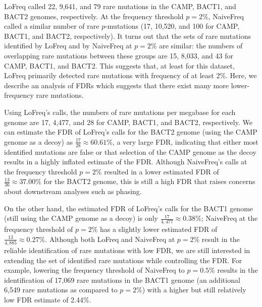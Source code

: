 LoFreq called 22, 9,641, and 79 rare mutations in the CAMP, BACT1, and BACT2 genomes, respectively. At the frequency threshold $p = 2\%$, NaiveFreq called a similar number of rare $p$-mutations (17, 10,520, and 100 for CAMP, BACT1, and BACT2, respectively). It turns out that the sets of rare mutations identified by LoFreq and by NaiveFreq at $p = 2\%$ are similar: the numbers of overlapping rare mutations between these groups are 15, 8,033, and 43 for CAMP, BACT1, and BACT2. This suggests that, at least for this dataset, LoFreq primarily detected rare mutations with frequency of at least 2\%. Here, we describe an analysis of FDRs which suggests that there exist many more lower-frequency rare mutations.

Using LoFreq's calls, the numbers of rare mutations per megabase for each genome are 17, 4,477, and 28 for CAMP, BACT1, and BACT2, respectively. We can estimate the FDR of LoFreq's calls for the BACT2 genome (using the CAMP genome as a decoy) as $\frac{17}{28} \approx 60.61\%$, a very large FDR, indicating that either most identified mutations are false or that selection of the CAMP genome as the decoy results in a highly inflated estimate of the FDR. Although NaiveFreq's calls at the frequency threshold $p = 2\%$ resulted in a lower estimated FDR of $\frac{13}{36} \approx 37.00\%$ for the BACT2 genome, this is still a high FDR that raises concerns about downstream analyses such as phasing.

On the other hand, the estimated FDR of LoFreq's calls for the BACT1 genome (still using the CAMP genome as a decoy) is only $\frac{17}{4,477} \approx 0.38\%$; NaiveFreq at the frequency threshold of $p = 2\%$ has a slightly lower estimated FDR of $\frac{13}{4,885} \approx 0.27\%$. Although both LoFreq and NaiveFreq at $p = 2\%$ result in the reliable identification of rare mutations with low FDR, we are still interested in extending the set of identified rare mutations while controlling the FDR. For example, lowering the frequency threshold of NaiveFreq to $p = 0.5\%$ results in the identification of 17,069 rare mutations in the BACT1 genome (an additional 6,549 rare mutations as compared to $p = 2\%$) with a higher but still relatively low FDR estimate of 2.44\%.\endinput